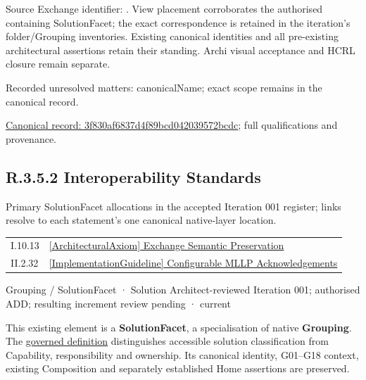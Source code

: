 Source Exchange identifier: \texttt{}. View placement corroborates
the authorised containing SolutionFacet; the exact correspondence is retained in the
iteration's folder/Grouping inventories. Existing canonical identities and all
pre-existing architectural assertions retain their standing. Archi visual
acceptance and HCRL closure remain separate.


{\small Recorded unresolved matters: canonicalName; exact scope remains in the canonical record.}\par
{\footnotesize \href{../../../../../../../continuum/grouping/3f830af6837d4f89bcd042039572bcdc.md}{Canonical record: 3f830af6837d4f89bcd042039572bcdc}; full qualifications and provenance.}\par
\subsection*{R.3.5.2 Interoperability Standards}
\label{navigation:R.3.5.2}

Primary SolutionFacet allocations in the accepted Iteration 001 register; links resolve to each statement’s one canonical native-layer location.\par
\begin{longtable}{p{.22\linewidth}p{.73\linewidth}}
I.10.13 & \hyperref[element:602eb50793f448d8bdbc92d41f851877]{[ArchitecturalAxiom] Exchange Semantic Preservation} \\
II.2.32 & \hyperref[element:ab4206c7312449569abaa818b3a8727a]{[ImplementationGuideline] Configurable MLLP Acknowledgements} \\
\end{longtable}
\label{element:a44091225174403ebd2c5b75ba690a09}
{\small Grouping / SolutionFacet · Solution Architect-reviewed Iteration 001; authorised ADD; resulting increment review pending · current}\par

This existing element is a \textbf{SolutionFacet}, a specialisation of native
\textbf{Grouping}. The \href{\detokenize{../../../../../../../governance/continuum-representation.md#solutionfacet-classification--1119-candidate}}{governed definition}
distinguishes accessible solution classification from Capability, responsibility
and ownership. Its canonical identity, G01–G18 context, existing Composition
and separately established Home assertions are preserved.



